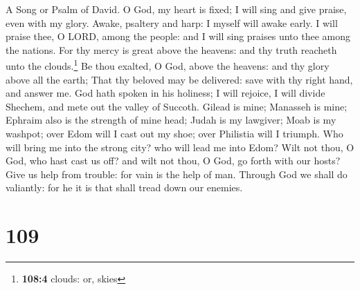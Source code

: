 A Song or Psalm of David.  O God, my heart is fixed; I
will sing and give praise, even with my glory.  Awake,
psaltery and harp: I myself will awake early.  I will
praise thee, O LORD, among the people: and I will sing praises unto thee
among the nations.  For thy mercy is great above the
heavens: and thy truth reacheth unto the clouds.\footnote{\textbf{108:4}
  clouds: or, skies}  Be thou exalted, O God, above the
heavens: and thy glory above all the earth;  That thy
beloved may be delivered: save with thy right hand, and answer me.
 God hath spoken in his holiness; I will rejoice, I will
divide Shechem, and mete out the valley of Succoth. 
Gilead is mine; Manasseh is mine; Ephraim also is the strength of mine
head; Judah is my lawgiver;  Moab is my washpot; over Edom
will I cast out my shoe; over Philistia will I triumph. 
Who will bring me into the strong city? who will lead me into Edom?
 Wilt not thou, O God, who hast cast us off? and wilt not
thou, O God, go forth with our hosts?  Give us help from
trouble: for vain is the help of man.  Through God we
shall do valiantly: for he it is that shall tread down our enemies.

\hypertarget{section-108}{%
\section{109}\label{section-108}}

